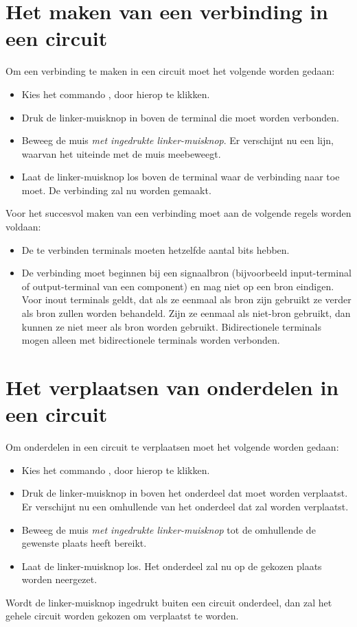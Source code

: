\section{Het maken van een verbinding in een circuit}
Om een verbinding te maken in een circuit moet het volgende
worden gedaan:
\begin{itemize}
\item Kies het commando , door hierop te klikken.
\item Druk de linker-muisknop in boven de terminal die moet worden verbonden.
\item Beweeg de muis {\it met ingedrukte linker-muisknop}. Er verschijnt nu een
      lijn, waarvan het uiteinde met de muis meebeweegt.
\item Laat de linker-muisknop los boven de terminal waar de verbinding naar toe moet.
	De verbin\-ding zal nu worden gemaakt.
\end{itemize}

Voor het succesvol maken van een verbinding moet aan de volgende regels
worden voldaan:
\begin{itemize}
\item De te verbinden terminals moeten hetzelfde aantal bits hebben.
\item De verbinding moet beginnen bij een signaalbron (bijvoorbeeld input-terminal
      of output-terminal van een component) en mag niet op een bron eindigen.
      Voor inout terminals geldt, dat als ze eenmaal als bron zijn gebruikt
      ze verder als bron zullen worden behandeld. Zijn ze eenmaal als
      niet-bron gebruikt, dan kunnen ze niet meer als bron worden gebruikt.
	Bidirectionele terminals mogen alleen met bidirectionele terminals worden verbonden.
\end{itemize}

\section{Het verplaatsen van onderdelen in een circuit}
Om onderdelen in een circuit te verplaatsen moet het volgende
worden gedaan:
\begin{itemize}
\item Kies het commando , door hierop te klikken.
\item Druk de linker-muisknop in boven het onderdeel dat moet worden verplaatst.
      Er verschijnt nu een omhullende van het onderdeel dat zal worden
      verplaatst.
\item Beweeg de muis {\it met ingedrukte linker-muisknop} tot de omhullende de
      gewenste plaats heeft bereikt.
\item Laat de linker-muisknop los. Het onderdeel zal nu op de gekozen plaats
      worden neergezet.
\end{itemize}
Wordt de linker-muisknop ingedrukt buiten een circuit onderdeel, dan zal het
gehele circuit worden gekozen om verplaatst te worden.

